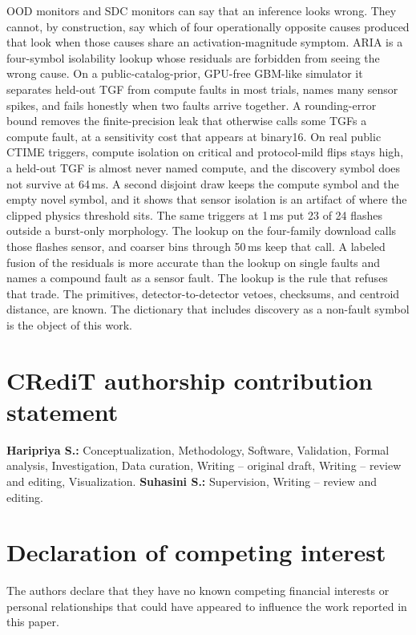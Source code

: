 \documentclass[preprint,12pt]{elsarticle}
\begin{document}
OOD monitors and SDC monitors can say that an inference looks wrong. They cannot, by construction, say which of four operationally opposite causes produced that look when those causes share an activation-magnitude symptom. ARIA is a four-symbol isolability lookup whose residuals are forbidden from seeing the wrong cause. On a public-catalog-prior, GPU-free GBM-like simulator it separates held-out TGF from compute faults in most trials, names many sensor spikes, and fails honestly when two faults arrive together. A rounding-error bound removes the finite-precision leak that otherwise calls some TGFs a compute fault, at a sensitivity cost that appears at binary16. On \RealCubes{} real public CTIME triggers, compute isolation on critical and protocol-mild flips stays high, a held-out TGF is almost never named compute, and the discovery symbol does not survive at 64\,ms. A second disjoint draw keeps the compute symbol and the empty novel symbol, and it shows that sensor isolation is an artifact of where the clipped physics threshold sits. The same triggers at 1\,ms put 23 of 24 flashes outside a burst-only morphology. The lookup on the four-family download calls those flashes sensor, and coarser bins through 50\,ms keep that call. A labeled fusion of the residuals is more accurate than the lookup on single faults and names a compound fault as a sensor fault. The lookup is the rule that refuses that trade. The primitives, detector-to-detector vetoes, checksums, and centroid distance, are known. The dictionary that includes discovery as a non-fault symbol is the object of this work.

\section*{CRediT authorship contribution statement}

\textbf{Haripriya S.:} Conceptualization, Methodology, Software, Validation, Formal analysis, Investigation, Data curation, Writing -- original draft, Writing -- review and editing, Visualization. \textbf{Suhasini S.:} Supervision, Writing -- review and editing.

\section*{Declaration of competing interest}

The authors declare that they have no known competing financial interests or personal relationships that could have appeared to influence the work reported in this paper.
\end{document}
